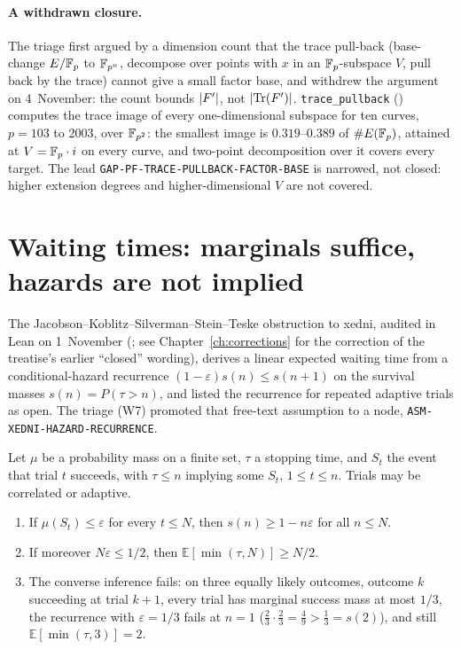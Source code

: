 \paragraph{A withdrawn closure.} The triage first argued by a dimension
count that the trace pull-back (base-change $E/\mathbb{F}_p$ to $\mathbb{F}_{p^n}$,
decompose over points with $x$ in an $\mathbb{F}_p$-subspace $V$, pull back by the
trace) cannot give a small factor base, and withdrew the argument on
4~November: the count bounds $\lvert F' \rvert$, not $\lvert \operatorname{Tr}(F') \rvert$.
\texttt{trace\_pullback}
()
computes the trace image of every one-dimensional subspace for ten curves,
$p=103$ to 2003, over $\mathbb{F}_{p^2}$: the smallest image is $0.319$--$0.389$ of
$\#E(\mathbb{F}_p)$, attained at $V=\mathbb{F}_p\cdot i$ on every curve, and two-point
decomposition over it covers every target. The lead
\texttt{GAP-PF-TRACE-PULLBACK-FACTOR-BASE} is narrowed, not closed: higher
extension degrees and higher-dimensional $V$ are not covered.

\section{Waiting times: marginals suffice, hazards are not implied}\label{sec:hd-hazard}

The Jacobson--Koblitz--Silverman--Stein--Teske obstruction to xedni,
audited in Lean on 1~November (;
see Chapter~\ref{ch:corrections} for the correction of the treatise's earlier
``closed'' wording), derives a linear expected waiting time from a
conditional-hazard recurrence $(1-\varepsilon)s(n)\le s(n+1)$ on the survival
masses $s(n)=P(\tau>n)$, and listed the recurrence for repeated adaptive
trials as open. The triage (W7) promoted that free-text assumption to a
node, \texttt{ASM-XEDNI-HAZARD-RECURRENCE}.

\begin{theorem}\label{thm:hd-hazard}
Let $\mu$ be a probability mass on a finite set, $\tau$ a stopping time, and
$S_t$ the event that trial $t$ succeeds, with $\tau\le n$ implying some
$S_t$, $1\le t\le n$. Trials may be correlated or adaptive.
\begin{enumerate}
\item If $\mu(S_t)\le\varepsilon$ for every $t\le N$, then
  $s(n)\ge1-n\varepsilon$ for all $n\le N$.
\item If moreover $N\varepsilon\le1/2$, then
  $\mathbb E[\min(\tau,N)]\ge N/2$.
\item The converse inference fails: on three equally likely outcomes, outcome
  $k$ succeeding at trial $k+1$, every trial has marginal success mass at
  most $1/3$, the recurrence with $\varepsilon=1/3$ fails at $n=1$
  ($\tfrac23\cdot\tfrac23=\tfrac49>\tfrac13=s(2)$), and still
  $\mathbb E[\min(\tau,3)]=2$.
\end{enumerate}
\end{theorem}

